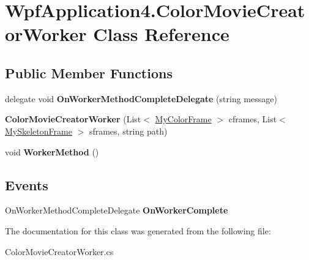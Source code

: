 \hypertarget{class_wpf_application4_1_1_color_movie_creator_worker}{\section{Wpf\-Application4.\-Color\-Movie\-Creator\-Worker Class Reference}
\label{class_wpf_application4_1_1_color_movie_creator_worker}
}
\subsection*{Public Member Functions}
\begin{DoxyCompactItemize}
\item 
\hypertarget{class_wpf_application4_1_1_color_movie_creator_worker_a0408a7b4781b7078f95d3fa7830cef4b}{delegate void {\bfseries On\-Worker\-Method\-Complete\-Delegate} (string message)}\label{class_wpf_application4_1_1_color_movie_creator_worker_a0408a7b4781b7078f95d3fa7830cef4b}

\item 
\hypertarget{class_wpf_application4_1_1_color_movie_creator_worker_a25eb25daa5128c2ecf174aee3b101a62}{{\bfseries Color\-Movie\-Creator\-Worker} (List$<$ \hyperlink{class_wpf_application4_1_1_my_color_frame}{My\-Color\-Frame} $>$ cframes, List$<$ \hyperlink{class_wpf_application4_1_1_my_skeleton_frame}{My\-Skeleton\-Frame} $>$ sframes, string path)}\label{class_wpf_application4_1_1_color_movie_creator_worker_a25eb25daa5128c2ecf174aee3b101a62}

\item 
\hypertarget{class_wpf_application4_1_1_color_movie_creator_worker_ab789dbebe3844f66cd63b14788325d2c}{void {\bfseries Worker\-Method} ()}\label{class_wpf_application4_1_1_color_movie_creator_worker_ab789dbebe3844f66cd63b14788325d2c}

\end{DoxyCompactItemize}
\subsection*{Events}
\begin{DoxyCompactItemize}
\item 
\hypertarget{class_wpf_application4_1_1_color_movie_creator_worker_a35731266e3dd189a08f248470195f277}{On\-Worker\-Method\-Complete\-Delegate {\bfseries On\-Worker\-Complete}}\label{class_wpf_application4_1_1_color_movie_creator_worker_a35731266e3dd189a08f248470195f277}

\end{DoxyCompactItemize}


The documentation for this class was generated from the following file\-:\begin{DoxyCompactItemize}
\item 
Color\-Movie\-Creator\-Worker.\-cs\end{DoxyCompactItemize}
